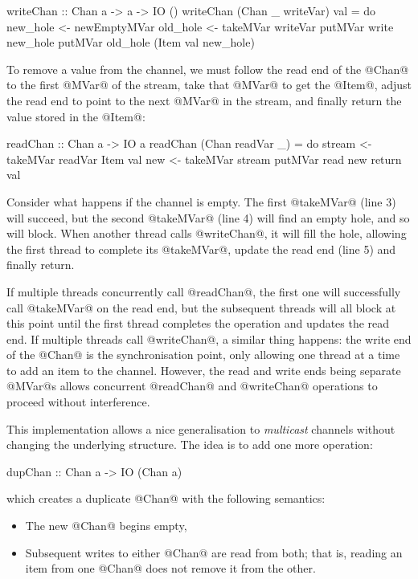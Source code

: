 \begin{haskell}
writeChan :: Chan a -> a -> IO ()
writeChan (Chan _ writeVar) val = do
  new_hole <- newEmptyMVar
  old_hole <- takeMVar writeVar
  putMVar write new_hole
  putMVar old_hole (Item val new_hole)
\end{haskell}

To remove a value from the channel, we must follow the read end of the
@Chan@ to the first @MVar@ of the stream, take that @MVar@ to get the
@Item@, adjust the read end to point to the next @MVar@ in the stream,
and finally return the value stored in the @Item@:

\begin{numhaskell}
readChan :: Chan a -> IO a
readChan (Chan readVar _) = do
  stream <- takeMVar readVar
  Item val new <- takeMVar stream
  putMVar read new
  return val
\end{numhaskell}

\noindent Consider what happens if the channel is empty.  The first
@takeMVar@ (line 3) will succeed, but the second @takeMVar@ (line 4)
will find an empty hole, and so will block.  When another thread calls
@writeChan@, it will fill the hole, allowing the first thread to
complete its @takeMVar@, update the read end (line 5) and finally
return.

If multiple threads concurrently call @readChan@, the first one will
successfully call @takeMVar@ on the read end, but the subsequent
threads will all block at this point until the first thread completes
the operation and updates the read end.  If multiple threads call
@writeChan@, a similar thing happens: the write end of the @Chan@ is
the synchronisation point, only allowing one thread at a time to add
an item to the channel.  However, the read and write ends being
separate @MVar@s allows concurrent @readChan@ and @writeChan@
operations to proceed without interference.

This implementation allows a nice generalisation to \emph{multicast}
channels without changing the underlying structure.  The idea is to
add one more operation:

\begin{haskell}
dupChan :: Chan a -> IO (Chan a)
\end{haskell}

\noindent which creates a duplicate @Chan@ with the following
semantics:

\begin{itemize}
\item The new @Chan@ begins empty,
\item Subsequent writes to either @Chan@ are read from both; that is,
  reading an item from one @Chan@ does not remove it from the other.
\end{itemize}

